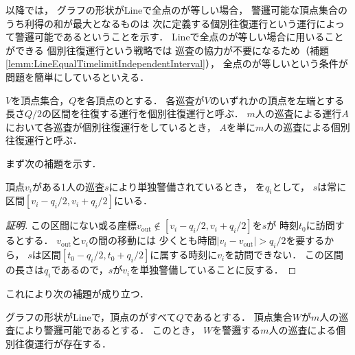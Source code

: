 以降では，
グラフの形状がLineで全点の{\idletime}が等しい場合，
警邏可能な頂点集合のうち利得の和が最大となるものは
次に定義する個別往復運行という運行によって警邏可能であるということを示す．
Lineで全点の{\idletime}が等しい場合に用いることができる
個別往復運行という戦略では
巡査の協力が不要になるため（補題\ref{lemm:LineEqualTimelimitIndependentInterval}），
全点の{\idletime}が等しいという条件が問題を簡単にしているといえる．


\begin{defi}
  $V$を頂点集合，$Q$を各頂点の{\idletime}とする．
  各巡査が$V$のいずれかの頂点を左端とする長さ$Q/2$の区間を往復する運行を個別往復運行と呼ぶ．
  $m$人の巡査による運行$A$において各巡査が個別往復運行をしているとき，
  $A$を単に$m$人の巡査による個別往復運行と呼ぶ．
\end{defi}



まず次の補題を示す．

\begin{lemm}
  \label{lemm:RangeOfPatrollerOnLine}
  頂点$v_i$がある1人の巡査$s$により単独警備されているとき，
  {\idletime}を$q_i$として，
  $s$は常に区間$[v_i - q_i/2, v_i + q_i/2]$にいる．
\end{lemm}

\begin{proof}[証明]
  \newcommand{\vout}{v_{\mathrm{out}}}
  この区間にない或る座標$\vout \notin [v_i - q_i/2, v_i + q_i/2]$を$s$が
  時刻$t_0$に訪問するとする．
  $\vout$と$v_i$の間の移動には
  少くとも時間$\lvert v_i - \vout \rvert > q _i / 2$を要するから，
  $s$は区間$[t_0 - q _i / 2, t_0 + q _i / 2]$に属する時刻に$v_i$を訪問できない．
  この区間の長さは$
    q_i
  $であるので，$s$が$v _i$を単独警備していることに反する．
\end{proof}



これにより次の補題が成り立つ．


\begin{lemm}
 \label{lemm:LineEqualTimelimitIndependentInterval}
  グラフの形状がLineで，頂点の{\idletime}がすべて$Q$であるとする．
  頂点集合$W$が$m$人の巡査により警邏可能であるとする．
  このとき，
  $W$を警邏する$m$人の巡査による個別往復運行が存在する．
\end{lemm}


